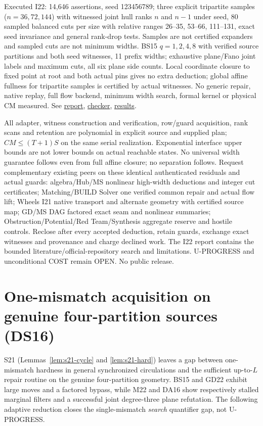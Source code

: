 \documentclass[11pt]{article}
\begin{document}
Executed I22: 14,646 assertions, seed 123456789; three explicit tripartite samples ($n=36,72,144$) with witnessed joint hull ranks $n$ and $n-1$ under seed, 80 sampled balanced cuts per size with relative ranges 26--35, 53--66, 111--131, exact seed invariance and general rank-drop tests. Samples are not certified expanders and sampled cuts are not minimum widths. BS15 $q=1,2,4,8$ with verified source partitions and both seed witnesses, 11 prefix widths; exhaustive plane/Fano joint labels and maximum cuts, all six plane side counts. Local coordinate closure to fixed point at root and both actual pins gives no extra deduction; global affine fullness for tripartite samples is certified by actual witnesses. No generic repair, native replay, full flow backend, minimum width search, formal kernel or physical CM measured. See \href{https://github.com/j15marti/pnp/commit/2ae8773ddae8d875b624a67223187b7e674ad82a}{report}, \href{https://github.com/j15marti/pnp/commit/fdc3eb86863e825127cbc875786087b754dafc93}{checker}, \href{https://github.com/j15marti/pnp/commit/a9d87cd0cac7f75aa51e0ffee29469812c9d39b0}{results}.

All adapter, witness construction and verification, row/guard acquisition, rank scans and retention are polynomial in explicit source and supplied plan; $CM\le(T+1)S$ on the same serial realization. Exponential interface upper bounds are not lower bounds on actual reachable states. No universal width guarantee follows even from full affine closure; no separation follows. Request complementary existing peers on these identical authenticated residuals and actual guards: algebra/Hub/MS nonlinear high-width deductions and integer cut certificates; Matching/BUILD Solver one verified common repair and actual flow lift; Wheels I21 native transport and alternate geometry with certified source map; GD/MS DAG factored exact seam and nonlinear summaries; Obstruction/Potential/Red Team/Synthesis aggregate reserve and hostile controls. Reclose after every accepted deduction, retain guards, exchange exact witnesses and provenance and charge declined work. The I22 report contains the bounded literature/official-repository search and limitations. U-PROGRESS and unconditional COST remain OPEN. No public release.


\section{One-mismatch acquisition on genuine four-partition sources (DS16)}\label{sec:ds16}
S21 (Lemmas~\ref{lem:s21-cycle} and \ref{lem:s21-hard}) leaves a gap between one-mismatch hardness in general synchronized circulations and the sufficient up-to-$L$ repair routine on the genuine four-partition geometry. BS15 and GD22 exhibit large moves and a factored bypass, while M22 and DA16 show respectively stalled marginal filters and a successful joint degree-three plane refutation. The following adaptive reduction closes the single-mismatch \emph{search} quantifier gap, not U-PROGRESS.
\end{document}
